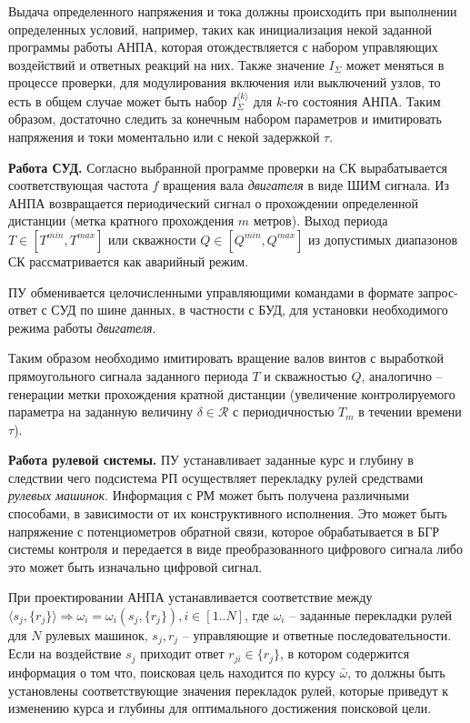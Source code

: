 Выдача определенного напряжения и тока должны происходить при выполнении определенных условий,
например, таких как инициализация некой заданной программы работы АНПА, которая
отождествляется с набором управляющих воздействий и ответных реакций на них.
Также значение $I_\Sigma$ может меняться в процессе проверки, для модулирования включения или выключений узлов,
то есть в общем случае может быть набор $I_\Sigma^{\langle k \rangle}$ для $k$-го состояния АНПА.
Таким образом, достаточно следить за конечным набором параметров и
имитировать напряжения и токи моментально или с некой задержкой $\tau$.

\textbf{Работа СУД.}
Согласно выбранной программе проверки на СК вырабатывается соответствующая 
частота $f$ вращения вала \textit{двигателя} в виде ШИМ сигнала.
Из АНПА возвращается периодический сигнал о прохождении определенной дистанции (метка кратного прохождения $m$ метров).
Выход периода $T \in [T^{min}, T^{max}]$ или скважности $Q \in [Q^{min}, Q^{max}]$ из допустимых диапазонов
СК рассматривается как аварийный режим.

ПУ обменивается целочисленными управляющими командами в формате запрос-ответ с СУД по шине данных, в частности с БУД,
для установки необходимого режима работы \textit{двигателя}.

Таким образом необходимо имитировать вращение валов винтов с выработкой прямоугольного сигнала заданного периода $T$ и скважностью $Q$,
аналогично -- генерации метки прохождения кратной дистанции
(увеличение контролируемого параметра на заданную величину $\delta \in \mathcal{R}$ с периодичностью $T_m$ в течении времени $\tau$).

\textbf{Работа рулевой системы.}
ПУ устанавливает заданные курс и глубину в следствии чего подсистема РП
осуществляет перекладку рулей средствами \textit{рулевых машинок}.
Информация с РМ может быть получена различными способами, в зависимости от их конструктивного исполнения.
Это может быть напряжение с потенциометров обратной связи, которое обрабатывается в БГР системы контроля
и передается в виде преобразованного цифрового сигнала
либо это может быть изначально  цифровой сигнал.

При проектировании АНПА устанавливается соответствие между $\langle s_j, \{r_j\} \rangle \Rightarrow \omega_i = \omega_i(s_j, \{r_j\}), i\in [1..N]$,
где $\omega_i$ -- заданные перекладки рулей для $N$ рулевых машинок,
$s_j, r_j$ -- управляющие и ответные последовательности.
Если на воздействие $s_j$ приходит ответ $r_{ji} \in \{r_j\}$, в котором содержится информация о том что,
поисковая цель находится по курсу $\bar \omega$, то должны быть установлены соответствующие значения перекладок рулей,
которые приведут к изменению курса и глубины для оптимального достижения поисковой цели.



